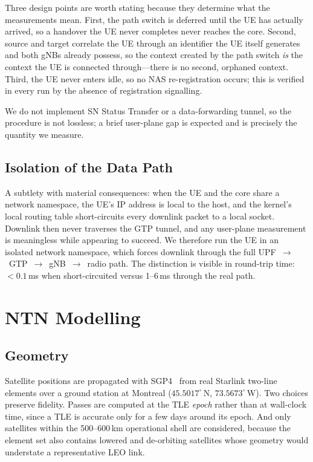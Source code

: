 \documentclass[conference]{IEEEtran}
\begin{document}
Three design points are worth stating because they determine what the
measurements mean. First, the path switch is deferred until the UE has actually
arrived, so a handover the UE never completes never reaches the core. Second,
source and target correlate the UE through an identifier the UE itself
generates and both gNBs already possess, so the context created by the path
switch \emph{is} the context the UE is connected through---there is no second,
orphaned context. Third, the UE never enters idle, so no NAS re-registration
occurs; this is verified in every run by the absence of registration signalling.

We do not implement SN Status Transfer or a data-forwarding tunnel, so the
procedure is not lossless; a brief user-plane gap is expected and is precisely
the quantity we measure.

\subsection{Isolation of the Data Path}

A subtlety with material consequences: when the UE and the core share a network
namespace, the UE's IP address is local to the host, and the kernel's local
routing table short-circuits every downlink packet to a local socket. Downlink
then never traverses the GTP tunnel, and any user-plane measurement is
meaningless while appearing to succeed. We therefore run the UE in an isolated
network namespace, which forces downlink through the full
UPF~$\rightarrow$~GTP~$\rightarrow$~gNB~$\rightarrow$~radio path. The
distinction is visible in round-trip time: ${<}0.1$\,ms when short-circuited
versus 1--6\,ms through the real path.

\section{NTN Modelling}
\label{sec:ntn}

\subsection{Geometry}

Satellite positions are propagated with SGP4~\cite{ref_skyfield} from real
Starlink two-line elements over a ground station at Montreal ($45.5017^\circ$\,N,
$73.5673^\circ$\,W). Two choices preserve fidelity. Passes are computed at the
TLE \emph{epoch} rather than at wall-clock time, since a TLE is accurate only
for a few days around its epoch. And only satellites within the 500--600\,km
operational shell are considered, because the element set also contains lowered
and de-orbiting satellites whose geometry would understate a representative LEO
link.
\end{document}
